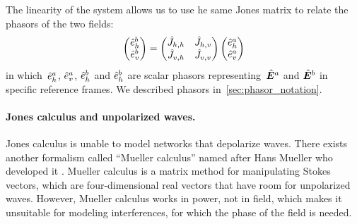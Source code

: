 \begin{samepage}
The linearity of the system allows us to use he same Jones matrix to relate the phasors of the two fields:
\begin{equation}
    \begin{pmatrix}
        \hat{e}^b_h\\
        \hat{e}^b_v
    \end{pmatrix}
    =
    \begin{pmatrix}
        \hat{J}_{h, h}   &   \hat{J}_{h, v} \\
        \hat{J}_{v, h}   &   \hat{J}_{v, v}
    \end{pmatrix}
    \begin{pmatrix}
        \hat{e}^a_h\\
        \hat{e}^a_v
    \end{pmatrix}
\end{equation}
in which~$\hat{e}^a_h$, $\hat{e}^a_v$, $\hat{e}^b_h$ and $\hat{e}^b_h$ are scalar phasors
representing~$\hat{\bm{E}}^a$ and $\hat{\bm{E}}^b$ in specific reference frames.
We described phasors in~\vref{sec:phasor_notation}.
\end{samepage}

\paragraph{Jones calculus and unpolarized waves.}
\label{sec:jones_unpolarized}
Jones calculus is unable to model networks that depolarize waves.
There exists another formalism called ``Mueller calculus'' named after Hans Mueller who developed it \parencite{mueller1943memorandum}.
Mueller calculus is a matrix method for manipulating Stokes vectors, which are four-dimensional real vectors that have room for unpolarized waves.
However, Mueller calculus works in power, not in field, which makes it unsuitable for modeling interferences, for which the phase of the field is needed.

